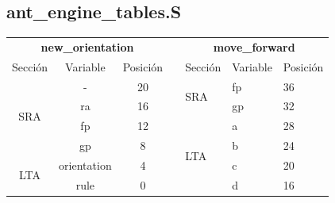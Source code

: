\documentclass[a4paper, 10pt, twoside, notitlepage]{article}
\begin{document}
\subsection{ant\_engine\_tables.S}

\begin{table}[htp]
\centering
\begin{tabular}{cccllll}
\multicolumn{3}{c}{\textbf{new\_orientation}}                                                                 &                       & \multicolumn{3}{c}{\textbf{move\_forward}}                                                                \\ \cline{1-3} \cline{5-7} 
\multicolumn{1}{|c|}{Sección}              & \multicolumn{1}{c|}{Variable}    & \multicolumn{1}{c|}{Posición} & \multicolumn{1}{l|}{} & \multicolumn{1}{l|}{Sección}              & \multicolumn{1}{l|}{Variable} & \multicolumn{1}{l|}{Posición} \\ \cline{1-3} \cline{5-7} 
\multicolumn{1}{|c|}{\multirow{4}{*}{SRA}} & \multicolumn{1}{c|}{-}           & \multicolumn{1}{c|}{20}       & \multicolumn{1}{l|}{} & \multicolumn{1}{l|}{\multirow{2}{*}{SRA}} & \multicolumn{1}{l|}{fp}       & \multicolumn{1}{l|}{36}       \\ \cline{2-3} \cline{6-7} 
\multicolumn{1}{|c|}{}                     & \multicolumn{1}{c|}{ra}          & \multicolumn{1}{c|}{16}       & \multicolumn{1}{l|}{} & \multicolumn{1}{l|}{}                     & \multicolumn{1}{l|}{gp}       & \multicolumn{1}{l|}{32}       \\ \cline{2-3} \cline{5-7} 
\multicolumn{1}{|c|}{}                     & \multicolumn{1}{c|}{fp}          & \multicolumn{1}{c|}{12}       & \multicolumn{1}{l|}{} & \multicolumn{1}{l|}{\multirow{8}{*}{LTA}} & \multicolumn{1}{l|}{a}        & \multicolumn{1}{l|}{28}       \\ \cline{2-3} \cline{6-7} 
\multicolumn{1}{|c|}{}                     & \multicolumn{1}{c|}{gp}          & \multicolumn{1}{c|}{8}        & \multicolumn{1}{l|}{} & \multicolumn{1}{l|}{}                     & \multicolumn{1}{l|}{b}        & \multicolumn{1}{l|}{24}       \\ \cline{1-3} \cline{6-7} 
\multicolumn{1}{|c|}{\multirow{2}{*}{LTA}} & \multicolumn{1}{c|}{orientation} & \multicolumn{1}{c|}{4}        & \multicolumn{1}{l|}{} & \multicolumn{1}{l|}{}                     & \multicolumn{1}{l|}{c}        & \multicolumn{1}{l|}{20}       \\ \cline{2-3} \cline{6-7} 
\multicolumn{1}{|c|}{}                     & \multicolumn{1}{c|}{rule}        & \multicolumn{1}{c|}{0}        & \multicolumn{1}{l|}{} & \multicolumn{1}{l|}{}                     & \multicolumn{1}{l|}{d}        & \multicolumn{1}{l|}{16}       \\ \cline{1-3} \cline{6-7} 

\end{tabular}
\end{table}
\end{document}

